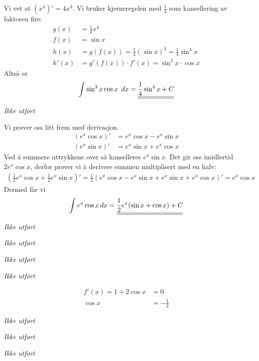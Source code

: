 \documentclass[a4paper,norsk,12pt]{article}
\begin{document}
Vi vet at $(x^4)' = 4x^3$. Vi bruker kjerneregelen med $\frac{1}{4}$ som
kansellering av faktoren fire:
\begin{align*}
  g(x) &= \frac{1}{4} x^4 \\
  f(x) &= \sin{x} \\
  h(x) &= g(f(x)) = \frac{1}{4}(\sin{x})^4 = \frac{1}{4} \sin^4{x} \\
  h'(x) &= g'(f(x)) \cdot f'(x) = \sin^3{x} \cdot \cos{x}
\end{align*}
Altså er
\begin{align*}
  \int \sin^3{x} \cos{x} \,dx = \svar{ \frac{1}{4} \sin^4{x} + C }
\end{align*}

\textit{Ikke utført}

Vi prøver oss litt frem med derivasjon.
\begin{align*}
  (e^x \cos{x})' &= e^x\cos{x} - e^x\sin{x} \\
  (e^x \sin{x})' &= e^x\sin{x} + e^x\cos{x}
\end{align*}
Ved å summere uttrykkene over så kanselleres $e^x\sin{x}$. Det gir oss
imidlertid $2e^x\cos{x}$, derfor prøver vi å derivere summen multiplisert med
en halv:
\begin{align*}
  \left( \frac{1}{2}e^x \cos{x} +
         \frac{1}{2}e^x \sin{x} \right)' =
    \frac{1}{2} \left( 
        e^x\cos{x}-e^x\sin{x} + e^x\sin{x} + e^x\cos{x}
      \right)' = e^x\cos{x}
\end{align*}
Dermed får vi
\begin{align*}
  \int{e^x\cos{x}} \,dx = 
  {\underline{\underline{ \frac{1}{2}e^x( \sin{x} + \cos{x} ) + C }}}
\end{align*}


\textit{Ikke utført}

\textit{Ikke utført}

\textit{Ikke utført}

\textit{Ikke utført}

\begin{align*}
  f'(x) = 1 + 2\cos{x} & = 0\\
  \cos{x} & = -\frac{1}{2}
\end{align*}

\textit{Ikke utført}

\textit{Ikke utført}

\textit{Ikke utført}
\end{document}
